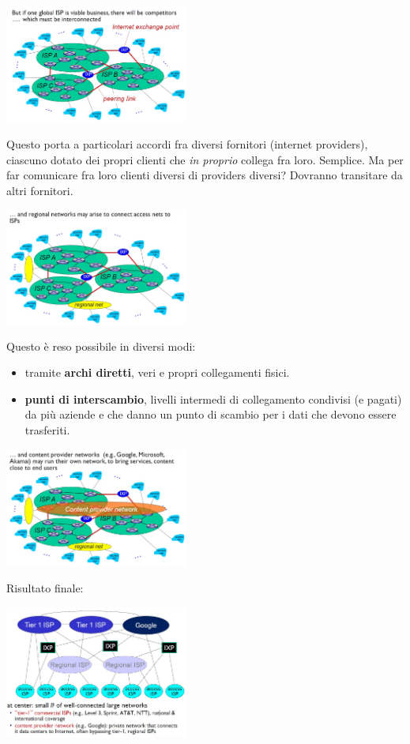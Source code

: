 \documentclass[10pt, a4paper, openany]{book}
\begin{document}
\begin{center}
    \includegraphics[width=60mm]{cap1 - Introduzione alle reti - 15.jpg}
\end{center}
\noindent Questo porta a particolari accordi fra diversi fornitori (internet providers), ciascuno dotato dei propri clienti che \textit{in proprio} collega fra loro. Semplice. Ma per far comunicare fra loro clienti diversi di providers diversi? Dovranno transitare da altri fornitori.
\begin{center}
    \includegraphics[width=60mm]{cap1 - Introduzione alle reti - 16.jpg}
\end{center}
\noindent Questo è reso possibile in diversi modi:
\begin{itemize}
    \item tramite \textbf{archi diretti}, veri e propri collegamenti fisici.
    \item \textbf{punti di interscambio}, livelli intermedi di collegamento condivisi (e pagati) da più aziende e che danno un punto di scambio per i dati che devono essere trasferiti.
\end{itemize}
\begin{center}
    \includegraphics[width=60mm]{cap1 - Introduzione alle reti - 17.jpg}
\end{center}
\noindent Risultato finale:
\begin{center}
    \includegraphics[width=60mm]{cap1 - Introduzione alle reti - 18.jpg}
\end{center}
\end{document}

